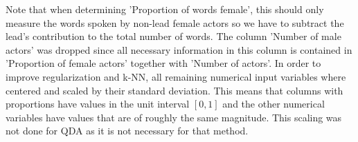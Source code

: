 \documentclass[../../project.tex]{subfiles}
\begin{document}
	Note that when determining 'Proportion of words female', this should only measure the words spoken by non-lead female actors so we have to subtract the lead's contribution to the total number of words. The column 'Number of male actors' was dropped since all necessary information in this column is contained in 'Proportion of female actors' together with 'Number of actors'. In order to improve regularization and k-NN, all remaining numerical input variables where centered and scaled by their standard deviation. This means that columns with proportions have values in the unit interval $[0,1]$ and the other numerical variables have values that are of roughly the same magnitude. This scaling was not done for QDA as it is not necessary for that method.
	
\end{document}
